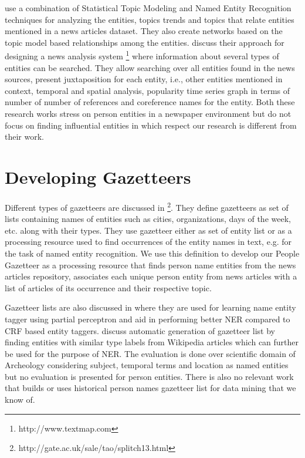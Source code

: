 \documentclass[letterpaper,11pt]{report}
\begin{document}
\cite{newman2006analyzing} use a combination of Statistical Topic Modeling and Named Entity Recognition techniques for analyzing the entities, topics trends and topics that relate entities mentioned in a news articles dataset. They also create networks based on the topic model based relationships among the entities.
\cite{lloyd2005lydia} discuss their approach for designing a news analysis system \footnote{http://www.textmap.com} where information about several types of entities can be searched. They allow searching over all entities found in the news sources, present juxtaposition for each entity, i.e., other entities mentioned in context, temporal and spatial analysis, popularity time series graph in terms of number of number of references and coreference names for the entity.
Both these research works stress on person entities in a newspaper environment but do not focus on finding influential entities in which respect our research is different from their work.


\section{Developing Gazetteers}
Different types of gazetteers are discussed in \footnote{http://gate.ac.uk/sale/tao/splitch13.html}. They define gazetteers as set of lists containing names of entities such as cities, organizations, days of the week, etc. along with their types. They use gazetteer either as set of entity list or as a processing resource used to ﬁnd occurrences of the entity names in text, e.g. for the task of named entity recognition. We use this definition to develop our People Gazetteer as a processing resource that finds person name entities from the news articles repository, associates each unique person entity from news articles with a list of articles of its occurrence and their respective topic.

Gazetteer lists are also discussed in \cite{carlson2009learning} where they are used for learning name entity tagger using partial perceptron and aid in performing better NER compared to CRF based entity taggers.
\cite{zhang2009novel} discuss automatic generation of gazetteer list by finding entities with similar type labels from Wikipedia articles which can further be used for the purpose of NER. The evaluation is done over scientific domain of Archeology considering subject, temporal terms and location as named entities but no evaluation is presented for person entities.
There is also no relevant work that builds or uses historical person names gazetteer list for data mining that we know of.
\end{document}
